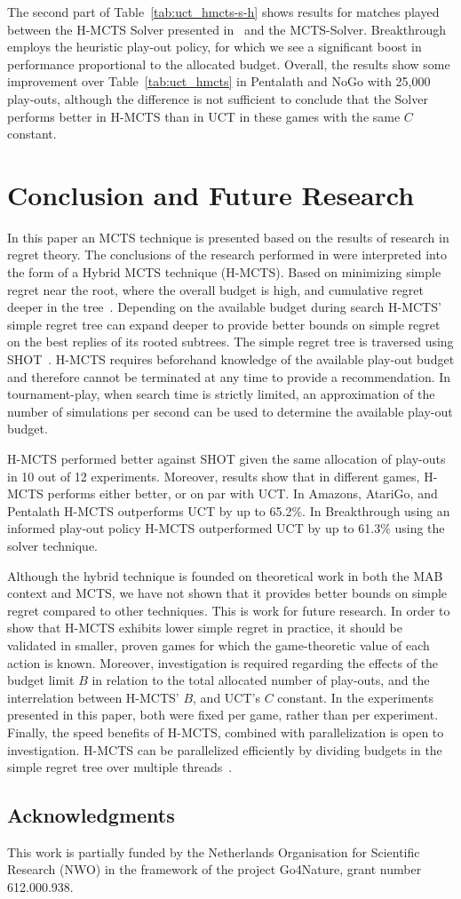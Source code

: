 \documentclass[a4paper]{llncs}
\begin{document}
The second part of Table~\ref{tab:uct_hmcts-s-h} shows results for matches played between the H-MCTS Solver presented in~\cite{pepels14novel} and the MCTS-Solver. Breakthrough employs the heuristic play-out policy, for which we see a significant boost in performance proportional to the allocated budget. Overall, the results show some improvement over Table~\ref{tab:uct_hmcts} in Pentalath and NoGo with 25,000 play-outs, although the difference is not sufficient to conclude that the Solver performs better in H-MCTS than in UCT in these games with the same $C$ constant.

\section{Conclusion and Future Research}
\label{sec:concl}
In this paper an MCTS technique is presented based on the results of research in regret theory. The conclusions of the research performed in \cite{Bubeck11Pure} were interpreted into the form of a Hybrid MCTS technique (H-MCTS). Based on minimizing simple regret near the root, where the overall budget is high, and cumulative regret deeper in the tree~\cite{tolpin2012mcts}. Depending on the available budget during search H-MCTS' simple regret tree can expand deeper to provide  better bounds on simple regret on the best replies of its rooted subtrees. The simple regret tree is traversed using SHOT~\cite{Cazenave14SHOT}. H-MCTS requires beforehand knowledge of the available play-out budget and therefore cannot be terminated at any time to provide a recommendation. In tournament-play, when search time is strictly limited, an approximation of the number of simulations per second can be used to determine the available play-out budget.

H-MCTS performed better against SHOT given the same allocation of play-outs in 10 out of 12 experiments. Moreover, results show that in different games, H-MCTS performs either better, or on par with UCT. In Amazons, AtariGo, and Pentalath H-MCTS outperforms UCT by up to 65.2\%. In Breakthrough using an informed play-out policy H-MCTS outperformed UCT by up to 61.3\% using the solver technique.

Although the hybrid technique is founded on theoretical work in both the MAB context and MCTS, we have not shown that it provides better bounds on simple regret compared to other techniques. This is work for future research. In order to show that H-MCTS exhibits lower simple regret in practice, it should be validated in smaller, proven games for which the game-theoretic value of each action is known. Moreover, investigation is required regarding the effects of the budget limit $B$ in relation to the total allocated number of play-outs, and the interrelation between H-MCTS' $B$, and UCT's $C$ constant. In the experiments presented in this paper, both were fixed per game, rather than per experiment. Finally, the speed benefits of H-MCTS, combined with parallelization is open to investigation. H-MCTS can be parallelized efficiently by dividing budgets in the simple regret tree over multiple threads~\cite{Cazenave14SHOT}.

\subsection*{Acknowledgments} 
This work is partially funded by the Netherlands Organisation for Scientific Research (NWO) in the framework of the project Go4Nature, grant number 612.000.938.



\end{document}
